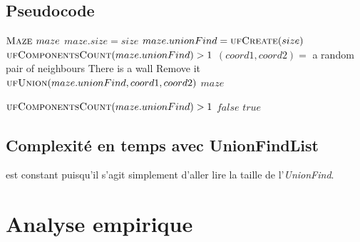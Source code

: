 \subsection{Pseudocode} %
\begin{codebox}
\li $\textnormal{\scshape Maze } maze$
\li $maze.size = size$
\li $maze.unionFind = \textnormal{\scshape ufCreate}(size)$
\li \While $\textnormal{\scshape ufComponentsCount}(maze.unionFind) > 1$
\Do
\li 	$(coord1, coord2) =$ a random pair of neighbours
\li		\If There is a wall
\li \Then Remove it
\li	$\textnormal{\scshape ufUnion}(maze.unionFind, coord1, coord2)$
\End
\End
\li \Return $maze$
\End
\end{codebox}

\begin{codebox}
\li \If $\textnormal{\scshape ufComponentsCount}(maze.unionFind) > 1$
\li \Then \Return $false$
\li \Else
\li \Return $true$
\End
\End
\end{codebox}

\subsection{Complexité en temps avec UnionFindList} %

 est constant puisqu'il s'agit simplement d'aller lire la taille de l'\textit{UnionFind}.

\section{Analyse empirique}
